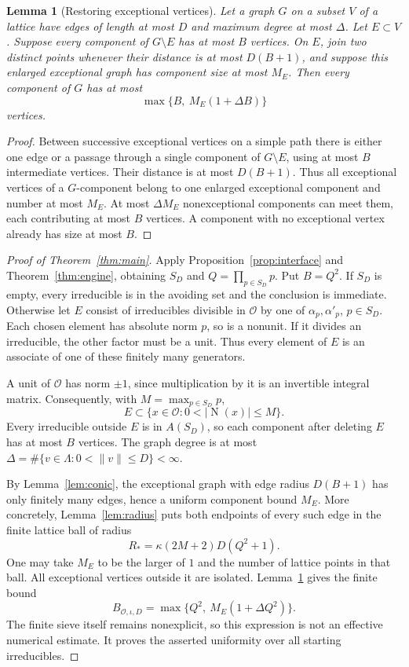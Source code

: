 \documentclass[11pt]{article}
\numberwithin{equation}{section}
\newtheorem{lemma}[theorem]{Lemma}
\theoremstyle{definition}\newtheorem{definition}[theorem]{Definition}
\theoremstyle{remark}\newtheorem{remark}[theorem]{Remark}
\newcommand{\OO}{\mathcal O}\newcommand{\PP}{\mathcal P}
\newcommand{\norm}[1]{\lVert #1\rVert}
\newcommand{\abs}[1]{\lvert #1\rvert}
\newcommand{\set}[1]{\{#1\}}
\newcommand{\N}{\operatorname{N}}
\begin{document}
\begin{lemma}[Restoring exceptional vertices]\label{lem:restoration}
Let a graph $G$ on a subset $V$ of a lattice have edges of length at most $D$ and maximum degree at most $\Delta$. Let $E\subset V$. Suppose every component of $G\setminus E$ has at most $B$ vertices. On $E$, join two distinct points whenever their distance is at most $D(B+1)$, and suppose this enlarged exceptional graph has component size at most $M_E$. Then every component of $G$ has at most
\[
 \max\{B,\ M_E(1+\Delta B)\}
\]
vertices.
\end{lemma}
\begin{proof}
Between successive exceptional vertices on a simple path there is either one edge or a passage through a single component of $G\setminus E$, using at most $B$ intermediate vertices. Their distance is at most $D(B+1)$. Thus all exceptional vertices of a $G$-component belong to one enlarged exceptional component and number at most $M_E$. At most $\Delta M_E$ nonexceptional components can meet them, each contributing at most $B$ vertices. A component with no exceptional vertex already has size at most $B$.
\end{proof}

\begin{proof}[Proof of Theorem~\ref{thm:main}]
Apply Proposition~\ref{prop:interface} and Theorem~\ref{thm:engine}, obtaining $S_D$ and $Q=\prod_{p\in S_D}p$. Put $B=Q^2$. If $S_D$ is empty, every irreducible is in the avoiding set and the conclusion is immediate. Otherwise let $E$ consist of irreducibles divisible in $\OO$ by one of $\alpha_p,\alpha'_p$, $p\in S_D$. Each chosen element has absolute norm $p$, so is a nonunit. If it divides an irreducible, the other factor must be a unit. Thus every element of $E$ is an associate of one of these finitely many generators.

A unit of $\OO$ has norm $\pm1$, since multiplication by it is an invertible integral matrix. Consequently, with $M=\max_{p\in S_D}p$,
\[
 E\subset\set{x\in\OO:0<\abs{\N(x)}\le M}.
\]
Every irreducible outside $E$ is in $A(S_D)$, so each component after deleting $E$ has at most $B$ vertices. The graph degree is at most
$\Delta=\#\set{v\in\Lambda:0<\norm v\le D}<\infty$.

By Lemma~\ref{lem:conic}, the exceptional graph with edge radius $D(B+1)$ has only finitely many edges, hence a uniform component bound $M_E$. More concretely, Lemma~\ref{lem:radius} puts both endpoints of every such edge in the finite lattice ball of radius
\[
 R_*=\kappa(2M+2)D(Q^2+1).
\]
One may take $M_E$ to be the larger of $1$ and the number of lattice points in that ball. All exceptional vertices outside it are isolated. Lemma~\ref{lem:restoration} gives the finite bound
\[
 B_{\OO,\iota,D}=\max\{Q^2,\ M_E(1+\Delta Q^2)\}.
\]
The finite sieve itself remains nonexplicit, so this expression is not an effective numerical estimate. It proves the asserted uniformity over all starting irreducibles.
\end{proof}
\end{document}

